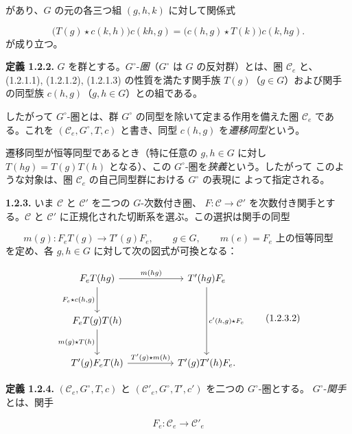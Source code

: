 \clearpage
{}%
があり、$G$ の元の各三つ組 $(g,h,k)$ に対して関係式

\begin{equation}
  \bigl(T(g)\star c(k,h)\bigr)c(kh,g)
  =\bigl(c(h,g)\star T(k)\bigr)c(k,hg).
  \tag{1.2.1.3}
\end{equation}
が成り立つ。

\noindent\textbf{定義 1.2.2.}\quad
$G$ を群とする。$G^\circ$-\emph{圏}（$G^\circ$ は $G$ の反対群）とは、圏
$\mathcal C_e$ と、(1.2.1.1), (1.2.1.2), (1.2.1.3) の性質を満たす関手族
$T(g)$（$g\in G$）および関手の同型族 $c(h,g)$（$g,h\in G$）との組である。

したがって $G^\circ$-圏とは、群 $G^\circ$ の同型を除いて定まる作用を備えた圏
$\mathcal C_e$ である。これを $(\mathcal C_e,G^\circ,T,c)$ と書き、同型
$c(h,g)$ を\emph{遷移同型}という。

遷移同型が恒等同型であるとき（特に任意の $g,h\in G$ に対し
$T(hg)=T(g)T(h)$ となる）、この $G^\circ$-圏を\emph{狭義}という。したがって
このような対象は、圏 $\mathcal C_e$ の自己同型群における $G^\circ$ の表現に
よって指定される。

\noindent\textbf{1.2.3.}\quad
いま $\mathcal C$ と $\mathcal C'$ を二つの $G$-次数付き圏、
$F\colon\mathcal C\to\mathcal C'$ を次数付き関手とする。$\mathcal C$ と
$\mathcal C'$ に正規化された切断系を選ぶ。この選択は関手の同型

\begin{equation}
  m(g)\colon F_eT(g)\longrightarrow T'(g)F_e,\qquad
  g\in G,\qquad m(e)=\text{$F_e$ 上の恒等同型}
  \tag{1.2.3.1}
\end{equation}
を定め、各 $g,h\in G$ に対して次の図式が可換となる：

\begin{equation}
\begin{tikzcd}[column sep=huge,row sep=large]
F_eT(hg)
  \arrow[r,"m(hg)"]
  \arrow[d,"{F_e\star c(h,g)}",swap]
&
T^{\prime}(hg)F_e
  \arrow[dd,"{c^{\prime}(h,g)\star F_e}"]
\\
F_eT(g)T(h)
  \arrow[d,"m(g)\star T(h)",swap]
&
{}
\\
T^{\prime}(g)F_eT(h)
  \arrow[r,"T^{\prime}(g)\star m(h)"]
&
T^{\prime}(g)T^{\prime}(h)F_e\mathpunct{.}
\end{tikzcd}
\tag{1.2.3.2}
\end{equation}

\noindent\textbf{定義 1.2.4.}\quad
$(\mathcal C_e,G^\circ,T,c)$ と
$(\mathcal C'_e,G^\circ,T',c')$ を二つの $G^\circ$-圏とする。
$G^\circ$-\emph{関手}とは、関手

\[
  F_e\colon\mathcal C_e\longrightarrow\mathcal C'_e
\]
